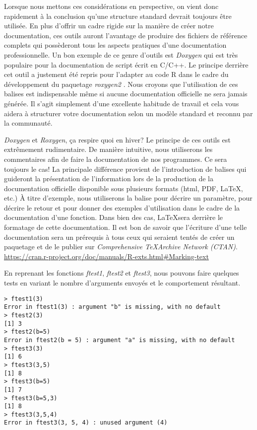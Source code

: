 Lorsque nous mettons ces considérations en perspective, on vient donc rapidement à la conclusion qu'une structure standard devrait toujours être utilisée. En plus d'offrir un cadre rigide sur la manière de créer notre documentation, ces outils auront l'avantage de produire des fichiers de référence complets qui possèderont tous les aspects pratiques d'une documentation professionnelle. Un bon exemple de ce genre d'outils est \emph{Doxygen} \cite{doxygen} qui est très populaire pour la documentation de script écrit en C/C++. Le principe derrière cet outil a justement été repris pour l'adapter au code R dans le cadre du développement du paquetage \emph{roxygen2} \cite{roxygen2}. Nous croyons que l'utilisation de ces balises est indispensable même si aucune documentation officielle ne sera jamais générée. Il s'agit simplement d'une excellente habitude de travail et cela vous aidera à structurer votre documentation selon un modèle standard et reconnu par la communauté.\\

\begin{moreInfo}{\emph{Doxygen} et \emph{Roxygen}, ça respire quoi en hiver?}
	Le principe de ces outils est extrêmement rudimentaire. De manière intuitive, nous utiliserons les commentaires afin de faire la documentation de nos programmes. Ce sera toujours le cas! La principale différence provient de l'introduction de balises qui guideront la présentation de l'information lors de la production de la documentation officielle disponible sous plusieurs formats (html, PDF, \LaTeX, etc.) À titre d'exemple, nous utiliserons la balise \@param pour décrire un paramètre, \@return pour décrire le retour et \@examples pour donner des exemples d'utilisation dans le cadre de la documentation d'une fonction. Dans bien des cas, \LaTeX  sera derrière le formatage de cette documentation. Il est bon de savoir que l'écriture d'une telle documentation sera un prérequis à tous ceux qui seraient tentés de créer un paquetage et de le publier sur \emph{Comprehensive \TeX Archive Network (CTAN)}. \\
	\url{https://cran.r-project.org/doc/manuals/R-exts.html#Marking-text}
\end{moreInfo}

En reprenant les fonctions \emph{ftest1}, \emph{ftest2} et \emph{ftest3}, nous pouvons faire quelques tests en variant le nombre d'arguments envoyés et le comportement résultant.

\begin{lstlisting}[caption = Passage d'arguments à une fonction,label=src:callFctParam]
> ftest1(3)
Error in ftest1(3) : argument "b" is missing, with no default
> ftest2(3)
[1] 3
> ftest2(b=5)
Error in ftest2(b = 5) : argument "a" is missing, with no default
> ftest3(3)
[1] 6
> ftest3(3,5)
[1] 8
> ftest3(b=5)
[1] 7
> ftest3(b=5,3)
[1] 8
> ftest3(3,5,4)
Error in ftest3(3, 5, 4) : unused argument (4)
\end{lstlisting}


